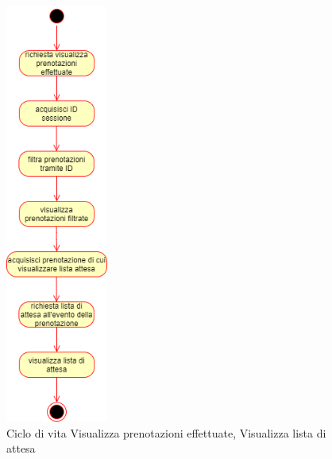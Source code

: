 \documentclass[11pt]{article}
\begin{document}
\begin{figure}[H]
\centering
\includegraphics[width=0.3\textwidth]{Ciclo di vita Visualizza prenotazioni, Visualizza lista attesa.png}
\caption{Ciclo di vita Visualizza prenotazioni effettuate, Visualizza lista di attesa}
\end{figure}
\end{document}
